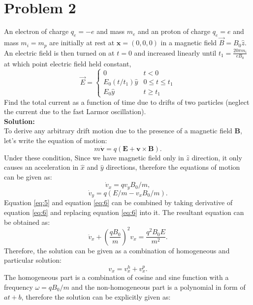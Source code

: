 \documentclass[11pt]{amsart}
\begin{document}
 \section*{Problem 2 }
An electron of charge $q_e=-e$ and mass $m_e$ and an proton of charge $q_e=e$ and mass $m_i=m_p$ are initially at rest at $\mathbf{x}=(0,0,0)$ in a magnetic field $\vec{B}=B_0 \hat{z}$. An electric field is then turned on at $t=0$ and increased linearly until $t_1=\frac{20\pi m_i}{e B_0}$ at which point electric field held constant,
\begin{equation*}
\vec{E}=
\left\{\begin{matrix}
0 & t<0\\ 
E_0(t/t_1)\hat{y} &0\leq t\leq t_1 \\ 
E_0 \hat{y} & t\geq t_1
\end{matrix}\right.
\end{equation*}
Find the total current as a function of time due to drifts of two particles (neglect
the current due to the fast Larmor oscillation).
\\
\textbf{Solution:}\\
To derive any arbitrary drift motion due to the presence of a magnetic field $\mathbf{B}$, let's write the equation of motion:
\begin{equation}
\label{eq:4}
m\dot{\mathbf{v}}=q(\mathbf{E}+\mathbf{v}\times \mathbf{B}).
\end{equation}
Under these condition,
Since we have magnetic field only in $\hat{z}$ direction, it only causes an acceleration in $\hat{x}$ and $\hat{y}$ directions, therefore the equations of motion can be given as:
\begin{equation}
\label{eq:5}
\dot{v}_x=qv_yB_0/m,
\end{equation}
\begin{equation}
\label{eq:6}
\dot{v}_y=q(E/m-v_xB_0/m).
\end{equation}
Equation \ref{eq:5} and equation \ref{eq:6} can be combined by taking derivative of equation \ref{eq:6} and replacing equation \ref{eq:6} into it. The resultant equation can be obtained as:
\begin{equation}
\label{eq:7}
\ddot{v}_{x}+(\frac{q B_{0}}{m})^2 v_{x}=\frac{q^2 B_{0}E}{m^2}.
\end{equation}
Therefore, the solution can be given as a combination of homogeneous and particular solution:
\begin{equation}
\label{eq:8}
v_{x}=v_{x}^h+v_{x}^p.
\end{equation}
The homogeneous part is a combination of cosine and sine function with a frequency $\omega=q B_0/m$ and the non-homogeneous part is a polynomial in form of $a t+ b$, therefore the solution can be explicitly given as:
\end{document}
